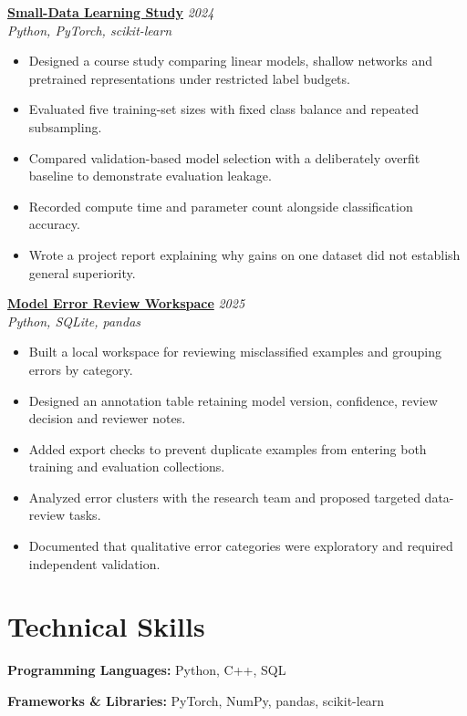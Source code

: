 \documentclass[11pt,a4paper]{article}
\begin{document}
\textbf{\href{https://example.com/demos/small-data-learning-study}{Small-Data Learning Study}} \hfill \textit{2024}\\
\textit{Python, PyTorch, scikit-learn}
\begin{itemize}[leftmargin=*,noitemsep,topsep=2pt]
\item Designed a course study comparing linear models, shallow networks and pretrained representations under restricted label budgets.
\item Evaluated five training-set sizes with fixed class balance and repeated subsampling.
\item Compared validation-based model selection with a deliberately overfit baseline to demonstrate evaluation leakage.
\item Recorded compute time and parameter count alongside classification accuracy.
\item Wrote a project report explaining why gains on one dataset did not establish general superiority.
\end{itemize}

\textbf{\href{https://example.com/demos/model-error-review-workspace}{Model Error Review Workspace}} \hfill \textit{2025}\\
\textit{Python, SQLite, pandas}
\begin{itemize}[leftmargin=*,noitemsep,topsep=2pt]
\item Built a local workspace for reviewing misclassified examples and grouping errors by category.
\item Designed an annotation table retaining model version, confidence, review decision and reviewer notes.
\item Added export checks to prevent duplicate examples from entering both training and evaluation collections.
\item Analyzed error clusters with the research team and proposed targeted data-review tasks.
\item Documented that qualitative error categories were exploratory and required independent validation.
\end{itemize}

\section{Technical Skills}
\textbf{Programming Languages:} Python, C++, SQL

\textbf{Frameworks \& Libraries:} PyTorch, NumPy, pandas, scikit-learn
\end{document}
